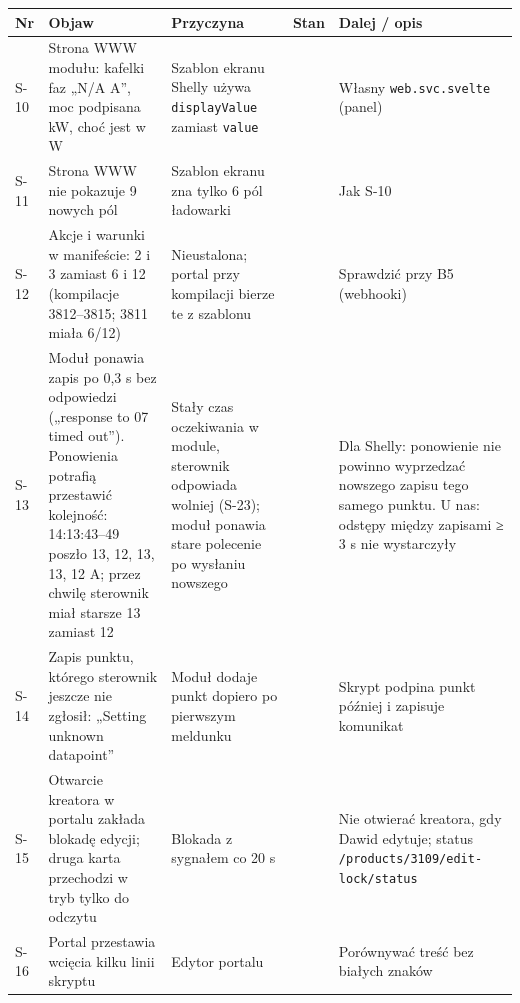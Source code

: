 \documentclass[11pt,a4paper]{article}
\begin{document}
\begin{longtable}{>{\raggedright\arraybackslash}p{3.00cm}>{\raggedright\arraybackslash}p{3.81cm}>{\raggedright\arraybackslash}p{2.97cm}>{\raggedright\arraybackslash}p{0.81cm}>{\raggedright\arraybackslash}p{3.81cm}}
\toprule
\rowcolor{apteallight}\textbf{Nr} & \textbf{Objaw} & \textbf{Przyczyna} & \textbf{Stan} & \textbf{Dalej / opis} \\
\midrule\endhead
\bottomrule\endfoot
S-10 & Strona WWW modułu: kafelki faz „N/A A”, moc podpisana kW, choć jest w W & Szablon ekranu Shelly używa \texttt{displayValue} zamiast \texttt{value} & \leavevmode{\symbolfont\color{apred}\textbf{✘}} & Własny \texttt{web.\allowbreak{}svc.\allowbreak{}svelte} (panel) \\
S-11 & Strona WWW nie pokazuje 9 nowych pól & Szablon ekranu zna tylko 6 pól ładowarki & \leavevmode{\symbolfont\color{apred}\textbf{✘}} & Jak S-10 \\
S-12 & Akcje i warunki w manifeście: 2 i 3 zamiast 6 i 12 (kompilacje 3812–3815; 3811 miała 6/12) & Nieustalona; portal przy kompilacji bierze te z szablonu & \leavevmode{\symbolfont\color{apred}\textbf{✘}} & Sprawdzić przy B5 (webhooki) \\
S-13 & Moduł ponawia zapis po 0,3 s bez odpowiedzi („response to 07 timed out”). Ponowienia potrafią przestawić kolejność: 14:13:43–49 poszło 13, 12, 13, 13, 12 A; przez chwilę sterownik miał starsze 13 zamiast 12 & Stały czas oczekiwania w module, sterownik odpowiada wolniej (S-23); moduł ponawia stare polecenie po wysłaniu nowszego & \leavevmode{\symbolfont\color{apred}\textbf{✘}} & Dla Shelly: ponowienie nie powinno wyprzedzać nowszego zapisu tego samego punktu. U nas: odstępy między zapisami {\symbolfont≥} 3 s nie wystarczyły \\
S-14 & Zapis punktu, którego sterownik jeszcze nie zgłosił: „Setting unknown datapoint” & Moduł dodaje punkt dopiero po pierwszym meldunku & \leavevmode{\symbolfont\color{apamber}\textbf{◐}} & Skrypt podpina punkt później i zapisuje komunikat \\
S-15 & Otwarcie kreatora w portalu zakłada blokadę edycji; druga karta przechodzi w tryb tylko do odczytu & Blokada z sygnałem co 20 s & \leavevmode{\symbolfont\color{apamber}\textbf{◐}} & Nie otwierać kreatora, gdy Dawid edytuje; status \texttt{/\allowbreak{}products/\allowbreak{}3109/\allowbreak{}edit-\allowbreak{}lock/\allowbreak{}status} \\
S-16 & Portal przestawia wcięcia kilku linii skryptu & Edytor portalu & \leavevmode{\symbolfont\color{apamber}\textbf{◐}} & Porównywać treść bez białych znaków \\

\end{longtable}
\end{document}

